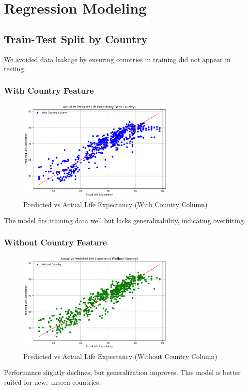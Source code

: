 \documentclass[11pt]{article}
\begin{document}
\section{Regression Modeling}

\subsection{Train-Test Split by Country}
We avoided data leakage by ensuring countries in training did not appear in testing.

\subsubsection*{With Country Feature}
\begin{figure}[H]
    \centering
    \includegraphics[width=0.7\textwidth]{output4.png}
    \caption{Predicted vs Actual Life Expectancy (With Country Column)}
\end{figure}
The model fits training data well but lacks generalizability, indicating overfitting.

\subsubsection*{Without Country Feature}
\begin{figure}[H]
    \centering
    \includegraphics[width=0.7\textwidth]{output5.png}
    \caption{Predicted vs Actual Life Expectancy (Without Country Column)}
\end{figure}
Performance slightly declines, but generalization improves. This model is better suited for new, unseen countries.
\end{document}
